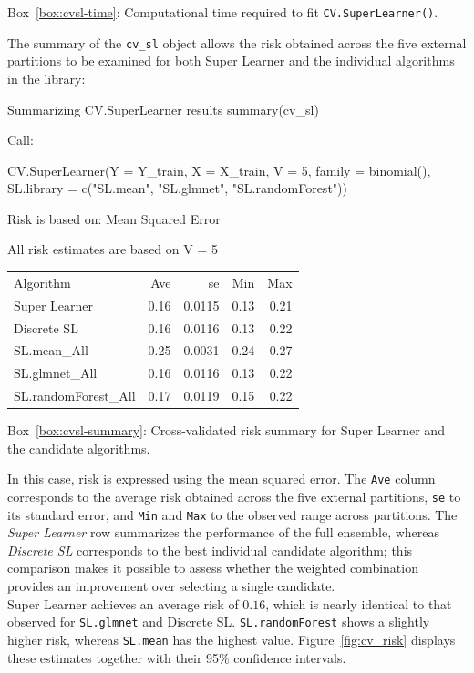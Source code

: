 \documentclass[12pt]{article}
\newcommand{\routputcaption}[2]{%
    \par\smallskip
    \begin{center}
        Box~\ref{#1}: #2
    \end{center}
}
\begin{document}
\routputcaption{box:cvsl-time}
{Computational time required to fit \texttt{CV.SuperLearner()}.}

The summary of the \texttt{cv\_sl} object allows the risk obtained across the five external partitions to be examined for both Super Learner and the individual algorithms in the library:

\begin{rcode}[label={code:cvsl-summary}]{Summarizing CV.SuperLearner results}
summary(cv_sl)
\end{rcode}

\begin{routputboxref}[label={box:cvsl-summary}]
	\ttfamily
	Call:\par
	CV.SuperLearner(Y = Y\_train, X = X\_train, V = 5, family = binomial(),
	SL.library = c("SL.mean", "SL.glmnet", "SL.randomForest"))\par
	
	\medskip
	Risk is based on: Mean Squared Error\par
	
	\medskip
	All risk estimates are based on V = 5\par
	
	\medskip
	\centering
	\begin{tabular}{lrrrr}
		Algorithm & Ave & se & Min & Max \\
		Super Learner        & 0.16 & 0.0115 & 0.13 & 0.21 \\
		Discrete SL          & 0.16 & 0.0116 & 0.13 & 0.22 \\
		SL.mean\_All         & 0.25 & 0.0031 & 0.24 & 0.27 \\
		SL.glmnet\_All       & 0.16 & 0.0116 & 0.13 & 0.22 \\
		SL.randomForest\_All & 0.17 & 0.0119 & 0.15 & 0.22 \\
	\end{tabular}
\end{routputboxref}

\routputcaption{box:cvsl-summary}
{Cross-validated risk summary for Super Learner and the candidate algorithms.}

In this case, risk is expressed using the mean squared error. The \texttt{Ave} column corresponds to the average risk obtained across the five external partitions, \texttt{se} to its standard error, and \texttt{Min} and \texttt{Max} to the observed range across partitions. The \textit{Super Learner} row summarizes the performance of the full ensemble, whereas \textit{Discrete SL} corresponds to the best individual candidate algorithm; this comparison makes it possible to assess whether the weighted combination provides an improvement over selecting a single candidate. \\
Super Learner achieves an average risk of $0.16$, which is nearly identical to that observed for \texttt{SL.glmnet} and Discrete SL. \texttt{SL.randomForest} shows a slightly higher risk, whereas \texttt{SL.mean} has the highest value. Figure~\ref{fig:cv_risk} displays these estimates together with their 95\% confidence intervals.
\end{document}
